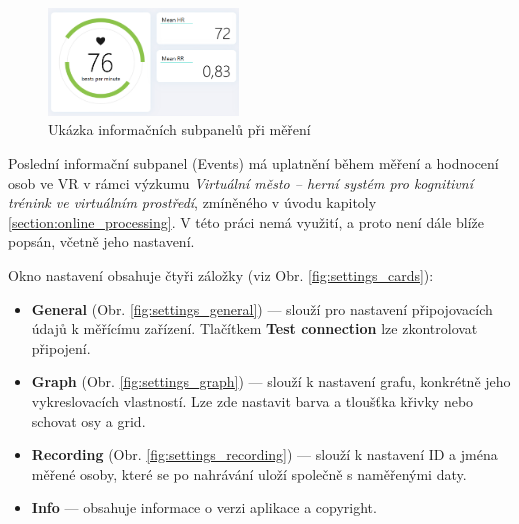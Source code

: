 \begin{figure}[H]
    \begin{center}
        \includegraphics[width=0.45\textwidth]{../assets/bbpm/app_info_subpanels}
        \caption{Ukázka informačních subpanelů při měření}
        \label{fig:app_info_subpanels}
    \end{center}
\end{figure}

Poslední informační subpanel (Events) má uplatnění během měření a hodnocení osob
ve VR v rámci výzkumu \textit{Virtuální město – herní systém pro kognitivní
trénink ve virtuálním prostředí}, zmíněného v úvodu kapitoly
\ref{section:online_processing}. V této práci nemá využití, a proto není dále
blíže popsán, včetně jeho nastavení.

Okno nastavení obsahuje čtyři záložky (viz Obr. \ref{fig:settings_cards}):
\begin{itemize}
    \item \textbf{General} (Obr. \ref{fig:settings_general}) --- slouží pro
    nastavení připojovacích údajů k měřícímu zařízení. Tlačítkem \textbf{Test
    connection} lze zkontrolovat připojení.
    \item \textbf{Graph} (Obr. \ref{fig:settings_graph}) --- slouží k nastavení
    grafu, konkrétně jeho vykreslovacích vlastností. Lze zde nastavit barva a
    tloušťka křivky nebo schovat osy a grid.
    \item \textbf{Recording} (Obr. \ref{fig:settings_recording}) --- slouží k
    nastavení ID a jména měřené osoby, které se po nahrávání uloží společně s
    naměřenými daty. 
    \item \textbf{Info} --- obsahuje informace o verzi aplikace a copyright.
\end{itemize}

